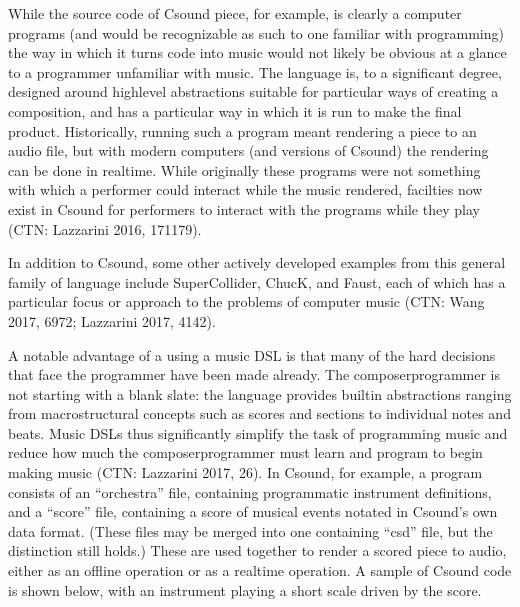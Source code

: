 \documentclass[letterpaper,10pt,english]{sphinxmanual}
\begin{document}
\sphinxAtStartPar
While the source code of Csound piece, for example, is clearly a computer programs
(and would be recognizable as such to one familiar with programming)
the way in which it turns code into music would not likely be obvious at a glance to a programmer unfamiliar with music.
The language is, to a significant degree, designed around high\sphinxhyphen{}level abstractions suitable for particular ways
of creating a composition, and has a particular way in which it is run to make the final product.
Historically, running such a program meant rendering a piece to an audio file, but
with modern computers (and versions of Csound) the rendering can be done in realtime.
While originally these programs were not something with which a performer could interact while the music rendered,
facilties now exist in Csound for performers to interact with the programs while they play (CTN: Lazzarini 2016, 171\sphinxhyphen{}179).

\sphinxAtStartPar
In addition to Csound, some other actively developed examples from this general family of language
include SuperCollider, ChucK, and Faust, each of which has a particular focus or approach to the problems
of computer music (CTN: Wang 2017, 69\sphinxhyphen{}72; Lazzarini 2017, 41\sphinxhyphen{}42).

\sphinxAtStartPar
A notable advantage of a using a music DSL is that many of the hard
decisions that face the programmer have been made already.
The composer\sphinxhyphen{}programmer is not starting with a blank slate:
the language provides built\sphinxhyphen{}in abstractions ranging from
macro\sphinxhyphen{}structural concepts such as scores and sections to individual notes and beats.
Music DSLs thus significantly simplify the task of programming music and reduce
how much the composer\sphinxhyphen{}programmer must learn and program to begin making music (CTN: Lazzarini 2017, 26).
In Csound, for example, a program consists of an “orchestra” file, containing
programmatic instrument definitions, and a “score” file, containing a score
of musical events notated in Csound’s own data format. (These files
may be merged into one containing “csd” file, but the distinction still holds.)
These are used together to render a scored piece to audio,
either as an offline operation or as a realtime operation.
A sample of Csound code is shown below, with an instrument playing a
short scale driven by the score.
\end{document}
